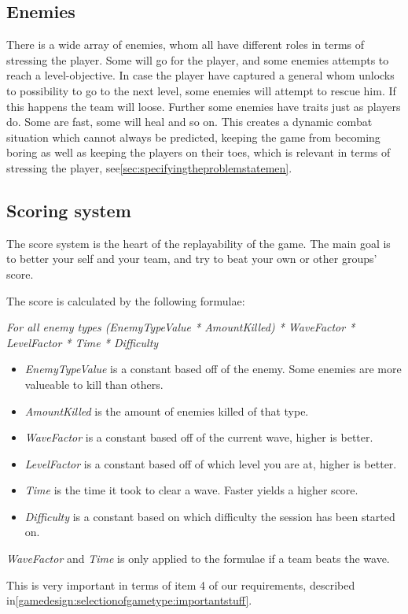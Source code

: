 \subsection{Enemies}
There is a wide array of enemies, whom all have different roles in terms of stressing the player. Some will go for the player, and some enemies attempts to reach a level-objective. In case the player have captured a general whom unlocks to possibility to go to the next level, some enemies will attempt to rescue him. If this happens the team will loose. 
Further some enemies have traits just as players do. Some are fast, some will heal and so on. This creates a dynamic combat situation which cannot always be predicted, keeping the game from becoming boring as well as keeping the players on their toes, which is relevant in terms of stressing the player, see\ref{sec:specifyingtheproblemstatemen}.

\subsection{Scoring system}\label{gamedesign:ourgame:scoring}
The score system is the heart of the replayability of the game. The main goal is to better your self and your team, and try to beat your own or other groups' score.

The score is calculated by the following formulae:
\begin{center}
\textit{For all enemy types (EnemyTypeValue * AmountKilled) * WaveFactor * LevelFactor * Time * Difficulty}
\end{center}
\begin{itemize}
\item \textit{EnemyTypeValue} is a constant based off of the enemy. Some enemies are more valueable to kill than others.
\item \textit{AmountKilled} is the amount of enemies killed of that type.
\item \textit{WaveFactor} is a constant based off of the current wave, higher is better.
\item \textit{LevelFactor} is a constant based off of which level you are at, higher is better.
\item \textit{Time} is the time it took to clear a wave. Faster yields a higher score.
\item \textit{Difficulty} is a constant based on which difficulty the session has been started on.
\end{itemize}

\emph{WaveFactor} and \emph{Time} is only applied to the formulae if a team beats the wave.

This is very important in terms of item 4 of our requirements, described in\ref{gamedesign:selectionofgametype:importantstuff}.